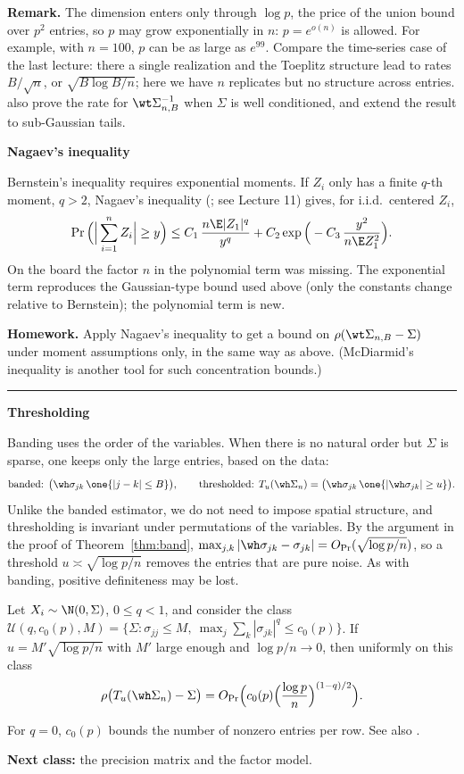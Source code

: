 \textbf{Remark.} The dimension enters only through \(\log p\), the price of the union bound over \(p^2\) entries, so \(p\) may grow exponentially in \(n\): \(p = e^{o(n)}\) is allowed. For example, with \(n = 100\), \(p\) can be as large as \(e^{99}\). Compare the time-series case of the last lecture: there a single realization and the Toeplitz structure lead to rates \(B/\sqrt n\), or \(\sqrt{B \log B / n}\); here we have \(n\) replicates but no structure across entries. \citet{BL08a} also prove the rate for \(\wt\Sigma_{n,B}^{-1}\) when \(\Sigma\) is well conditioned, and extend the result to sub-Gaussian tails.

\textbf{Nagaev's inequality}

Bernstein's inequality requires exponential moments. If \(Z_i\) only has a finite \(q\)-th moment, \(q > 2\), Nagaev's inequality (\citealp{Nag79}; see Lecture 11) gives, for i.i.d.\ centered \(Z_i\),
\[\Pr\Big(\Big|\sum_{i=1}^n Z_i\Big| \ge y\Big) \le C_1\, \frac{n \E|Z_1|^q}{y^q} + C_2 \exp\Big(-C_3\, \frac{y^2}{n \E Z_1^2}\Big).\]
On the board the factor \(n\) in the polynomial term was missing. The exponential term reproduces the Gaussian-type bound used above (only the constants change relative to Bernstein); the polynomial term is new.

\textbf{Homework.} Apply Nagaev's inequality to get a bound on \(\rho(\wt\Sigma_{n,B} - \Sigma)\) under moment assumptions only, in the same way as above. (McDiarmid's inequality is another tool for such concentration bounds.)

\begin{center}\rule{0.5\linewidth}{0.5pt}\end{center}

\textbf{Thresholding}

Banding uses the order of the variables. When there is no natural order but \(\Sigma\) is sparse, one keeps only the large entries, based on the data:
\[\text{banded: }\big(\wh\sigma_{jk}\, \one\{|j-k| \le B\}\big),\qquad
\text{thresholded: }T_u(\wh\Sigma_n) = \big(\wh\sigma_{jk}\, \one\{|\wh\sigma_{jk}| \ge u\}\big).\]
Unlike the banded estimator, we do not need to impose spatial structure, and thresholding is invariant under permutations of the variables. By the argument in the proof of Theorem~\ref{thm:band}, \(\max_{j,k} |\wh\sigma_{jk} - \sigma_{jk}| = O_{\Pr}(\sqrt{\log p / n})\), so a threshold \(u \asymp \sqrt{\log p / n}\) removes the entries that are pure noise. As with banding, positive definiteness may be lost.

\begin{theorem}[\citet{BL08b}]
Let \(X_i \sim \N(0, \Sigma)\), \(0 \le q < 1\), and consider the class \(\mathcal U(q, c_0(p), M) = \{\Sigma : \sigma_{jj} \le M,\ \max_j \sum_k |\sigma_{jk}|^q \le c_0(p)\}\). If \(u = M' \sqrt{\log p / n}\) with \(M'\) large enough and \(\log p / n \to 0\), then uniformly on this class
\[\rho\big(T_u(\wh\Sigma_n) - \Sigma\big) = O_{\Pr}\Big(c_0(p) \Big(\frac{\log p}{n}\Big)^{(1-q)/2}\Big).\]
\end{theorem}

For \(q = 0\), \(c_0(p)\) bounds the number of nonzero entries per row. See also \citet{EK08}.

\textbf{Next class:} the precision matrix and the factor model.
